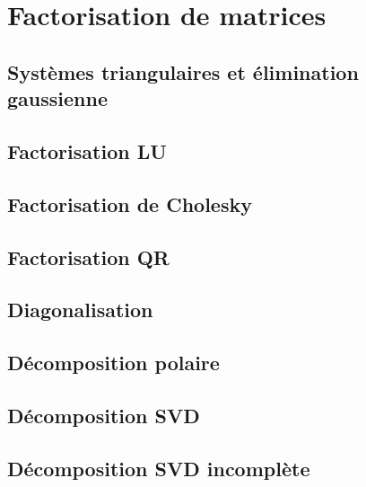 





\clearpage
\section{Factorisation de matrices}

\subsection{Systèmes triangulaires et élimination gaussienne}

\subsection{Factorisation LU}

\subsection{Factorisation de Cholesky}

\subsection{Factorisation QR}


\subsection{Diagonalisation}

\subsection{Décomposition polaire}

\subsection{Décomposition SVD}

\subsection{Décomposition SVD incomplète}



